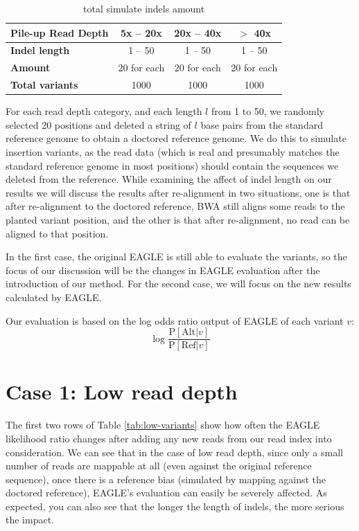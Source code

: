 \begin{table}[ht]
\center
\caption[total simulate indels amount]{total simulate indels amount}
\vspace{-1em}
\begin{tabular}{|l|c|c|c|}
\hline
\rowcolor{lightgray}
\textbf{Pile-up Read Depth}&    \textbf{5x -- 20x} &    \textbf{20x -- 40x} &    \textbf{$>$ 40x}\\
\hline
\cellcolor{lightgray}\textbf{Indel length} &   1 -- 50&     1 -- 50&     1 -- 50\\
\hline
\cellcolor{lightgray}\textbf{Amount} &   20 for each&    20 for each&     20 for each\\
\hline
\cellcolor{lightgray}\textbf{Total variants} &   1000&     1000&     1000\\
\hline
\end{tabular}
\label{tab:simulate-amount}
\end{table}


For each read depth category, and each length $l$ from 1 to 50, we randomly selected 20 positions and deleted a string of $l$ base pairs from the standard reference genome to obtain a doctored reference genome.  We do this to simulate insertion variants, as the read data (which is real and presumably matches the standard reference genome in most positions) should contain the sequences we deleted from the reference.  While examining the affect of indel length on our results we will discuss the results after re-alignment in two situations, one is that after re-alignment to the doctored reference, BWA still aligns some reads to the planted variant position, and the other is that after re-alignment, no read can be aligned to that position.

In the first case, the original EAGLE is still able to evaluate the variants, so the focus of our discussion will be the changes in EAGLE evaluation after the introduction of our method. For the second case, we will focus on the new results calculated by EAGLE.

\begin{samepage}
\noindent
Our evaluation is based on the log odds ratio output of EAGLE of each variant $v$:
\begin{equation*}
\log \frac{\text{P}[\text{Alt} | v]}{\text{P}[\text{Ref} | v]}
\end{equation*}
\end{samepage}


\section{Case 1: Low read depth}
The first two rows of Table \ref{tab:low-variants} show how often the EAGLE likelihood ratio changes after adding any new reads from our read index into consideration.
We can see that in the case of low read depth, since only a small number of reads are mappable at all (even against the original reference sequence), once there is a reference bias (simulated by mapping against the doctored reference), EAGLE's evaluation can easily be severely affected.  As expected, you can also see that the longer the length of indels, the more serious the impact.

